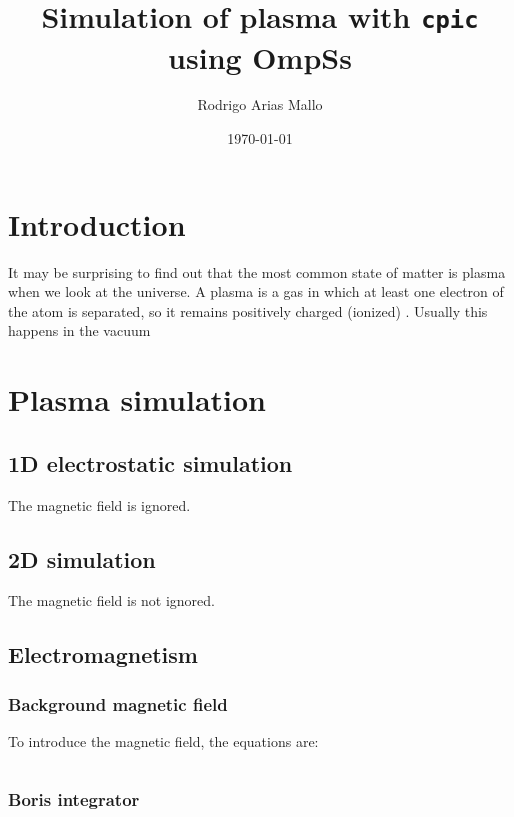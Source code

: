 \documentclass{book}
\title{Simulation of plasma with \texttt{cpic} using OmpSs}
\author{Rodrigo Arias Mallo}
\date{\today}
\begin{document}
\maketitle
\tableofcontents

\chapter{Introduction}

It may be surprising to find out that the most common state of matter is plasma 
when we look at the universe. A plasma is a gas in which at least one electron 
of the atom is separated, so it remains positively charged (ionized) 
\cite{chen}.  Usually this happens in the vacuum

\chapter{Plasma simulation}



\section{1D electrostatic simulation}
The magnetic field is ignored.

\section{2D simulation}
The magnetic field is not ignored.

\section{Electromagnetism}

\subsection{Background magnetic field}

To introduce the magnetic field, the equations are:

$$ $$

\subsection{Boris integrator} %
\end{document}
